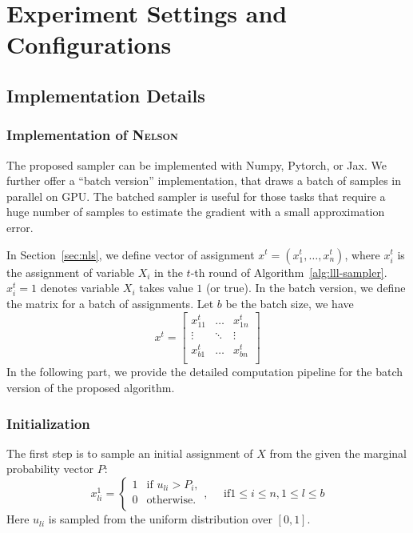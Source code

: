 \documentclass[letterpaper]{article} %
\newcommand{\nls}{\textsc{Nelson}\xspace}
\begin{document}
\section{Experiment Settings and Configurations}
\label{appendix:exp-set}
\subsection{Implementation Details} \label{appendix:implementation}

\subsubsection{Implementation of \nls} The proposed sampler can be implemented with Numpy, Pytorch, or Jax. We further offer a ``batch version'' implementation, that draws a batch of samples in parallel on GPU. The batched sampler is useful for those tasks that require a huge number of samples to estimate the gradient with a small approximation error. 

{In Section~\ref{sec:nls}, we define  vector of assignment  $x^t=(x^t_1, \dots, x^t_n)$,
where $x_i^t$ is the assignment of variable $X_i$ in the $t$-th round of Algorithm~\ref{alg:lll-sampler}. $x^t_i=1$ denotes  variable $X_i$ takes value $1$ (or true). In the batch version, we define the matrix for a batch  of assignments. Let $b$ be the batch size, we have}
\begin{equation*}
x^{t}=\begin{bmatrix}
x^t_{11} & \dots & x^t_{1n} \\
  \vdots & \ddots & \vdots \\
x^t_{b1} & \dots & x^t_{bn} \\
\end{bmatrix}
\end{equation*}
{In the following part, we provide the detailed computation pipeline for the batch version of the proposed algorithm.} 

\subsubsection{Initialization} {The first step is to sample an initial assignment of $X$ from the given the marginal probability vector $P$:}
\begin{equation}
 x^1_{li} = \begin{cases}
 1&\text{if } u_{li}> P_i,\\
 0 &\text{otherwise}. \\
 \end{cases},\quad \text{ if} 1\le i\le n, 1\le l\le b
\end{equation}
{Here $u_{li}$ is sampled from the uniform distribution over $[0,1]$.}
\end{document}
